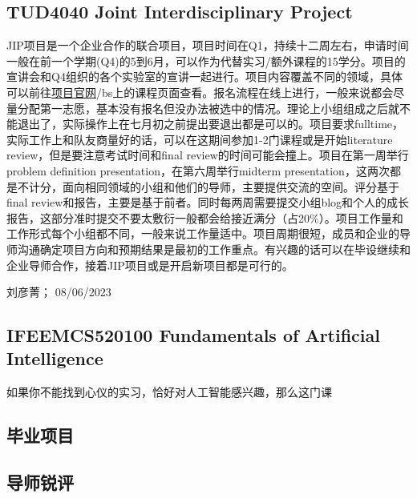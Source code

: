 \subsection{TUD4040 Joint Interdisciplinary Project}
JIP项目是一个企业合作的联合项目，项目时间在Q1，持续十二周左右，申请时间一般在前一个学期(Q4)的5到6月，可以作为代替实习/额外课程的15学分。项目的宣讲会和Q4组织的各个实验室的宣讲一起进行。项目内容覆盖不同的领域，具体可以前往\href{https://www.jointinterdisciplinaryproject.nl/}{\uline{项目官网}}/bs上的课程页面查看。报名流程在线上进行，一般来说都会尽量分配第一志愿，基本没有报名但没办法被选中的情况。理论上小组组成之后就不能退出了，实际操作上在七月初之前提出要退出都是可以的。项目要求fulltime，实际工作上和队友商量好的话，可以在这期间参加1-2门课程或是开始literature review，但是要注意考试时间和final review的时间可能会撞上。项目在第一周举行problem definition presentation，在第六周举行midterm presentation，这两次都是不计分，面向相同领域的小组和他们的导师，主要提供交流的空间。评分基于final review和报告，主要是基于前者。同时每两周需要提交小组blog和个人的成长报告，这部分准时提交不要太敷衍一般都会给接近满分（占20\%）。项目工作量和工作形式每个小组都不同，一般来说工作量适中。项目周期很短，成员和企业的导师沟通确定项目方向和预期结果是最初的工作重点。有兴趣的话可以在毕设继续和企业导师合作，接着JIP项目或是开启新项目都是可行的。

\begin{flushright}
刘彦菁； 08/06/2023
\end{flushright}
\subsection{IFEEMCS520100 Fundamentals of Artificial Intelligence}
如果你不能找到心仪的实习，恰好对人工智能感兴趣，那么这门课

\subsection{毕业项目}

\subsection{导师锐评}
